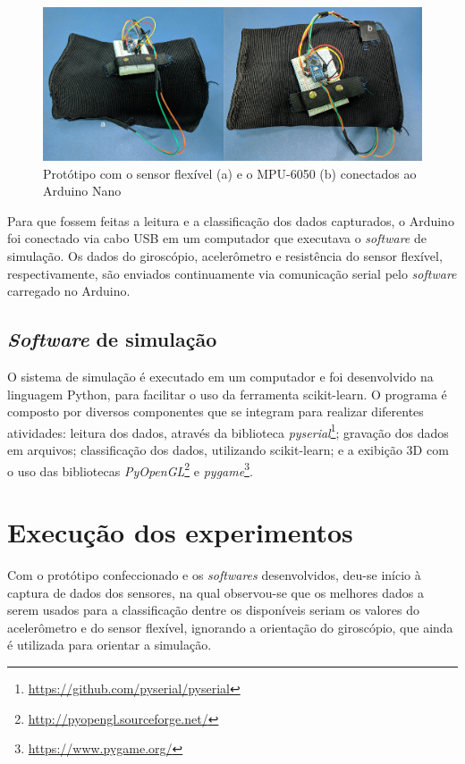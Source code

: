 \begin{figure}[ht]
	\caption{\label{fig:result_prototipo}Protótipo com o sensor flexível (a) e o MPU-6050 (b) conectados ao Arduino Nano}
	\begin{center}
	    \includegraphics[width=.8\textwidth]{resources/result_prototipo}
	\end{center}
\end{figure}

Para que fossem feitas a leitura e a classificação dos dados capturados, o Arduino foi conectado via cabo USB em um computador que executava o \textit{software} de simulação. Os dados do giroscópio, acelerômetro e resistência do sensor flexível, respectivamente, são enviados continuamente via comunicação serial pelo \textit{software} carregado no Arduino.

\subsection{\textit{Software} de simulação}\label{sec:result_simulacao}
O sistema de simulação é executado em um computador e foi desenvolvido na linguagem Python, para facilitar o uso da ferramenta scikit-learn. O programa é composto por diversos componentes que se integram para realizar diferentes atividades: leitura dos dados, através da biblioteca \textit{pyserial}\footnote{\url{https://github.com/pyserial/pyserial}}; gravação dos dados em arquivos; classificação dos dados, utilizando scikit-learn; e a exibição 3D com o uso das bibliotecas \textit{PyOpenGL}\footnote{\url{http://pyopengl.sourceforge.net/}} e \textit{pygame}\footnote{\url{https://www.pygame.org/}}.

\section{Execução dos experimentos}\label{sec:result_execucao}

Com o protótipo confeccionado e os \textit{softwares} desenvolvidos, deu-se início à captura de dados dos sensores, na qual observou-se que os melhores dados a serem usados para a classificação dentre os disponíveis seriam os valores do acelerômetro e do sensor flexível, ignorando a orientação do giroscópio, que ainda é utilizada para orientar a simulação.


